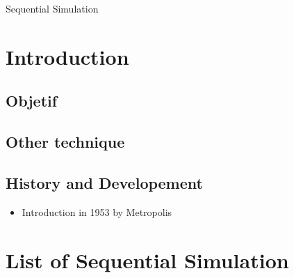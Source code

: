 \documentclass[twocolumn]{article}
\numberwithin{equation}{section}
\begin{document}
\begin{center}
     \Large{Sequential Simulation} \\
\end{center}

\section{Introduction}


\subsection{Objetif}



\subsection{Other technique}


\subsection{History and Developement}
\begin{itemize}
	\item Introduction in 1953 by Metropolis
\end{itemize}



\section{List of Sequential Simulation}





	
	
\end{document}
